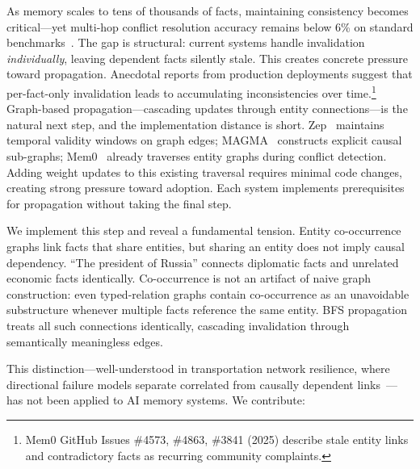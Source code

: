 \documentclass{article}
\begin{document}
As memory scales to tens of thousands of facts, maintaining consistency becomes critical---yet multi-hop conflict resolution accuracy remains below 6\% on standard benchmarks~\citep{memoryagentbench_2026}.
The gap is structural: current systems handle invalidation \textit{individually}, leaving dependent facts silently stale.
This creates concrete pressure toward propagation.
Anecdotal reports from production deployments suggest that per-fact-only invalidation leads to accumulating inconsistencies over time.\footnote{Mem0 GitHub Issues \#4573, \#4863, \#3841 (2025) describe stale entity links and contradictory facts as recurring community complaints.}
Graph-based propagation---cascading updates through entity connections---is the natural next step, and the implementation distance is short.
Zep~\citep{zep_2025} maintains temporal validity windows on graph edges; MAGMA~\citep{magma_2026} constructs explicit causal sub-graphs; Mem0~\citep{mem0_2024} already traverses entity graphs during conflict detection.
Adding weight updates to this existing traversal requires minimal code changes, creating strong pressure toward adoption.
Each system implements prerequisites for propagation without taking the final step.

We implement this step and reveal a fundamental tension.
Entity co-occurrence graphs link facts that share entities, but sharing an entity does not imply causal dependency.
``The president of Russia'' connects diplomatic facts and unrelated economic facts identically.
Co-occurrence is not an artifact of naive graph construction: even typed-relation graphs contain co-occurrence as an unavoidable substructure whenever multiple facts reference the same entity.
BFS propagation treats all such connections identically, cascading invalidation through semantically meaningless edges.

This distinction---well-understood in transportation network resilience, where directional failure models separate correlated from causally dependent links~\citep{chen_network_2007}---has not been applied to AI memory systems.
We contribute:
\end{document}
